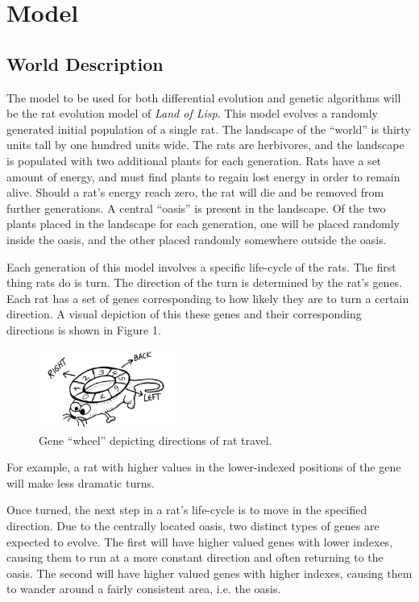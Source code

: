 \documentclass{sig-alternate}
\begin{document}
\section{Model}

\subsection{World Description}
The model to be used for both differential evolution and genetic algorithms will be the rat evolution model of \emph{Land of Lisp}.  This model evolves a randomly generated initial population of a single rat.  The landscape of the ``world'' is thirty units tall by one hundred units wide.  The rats are herbivores, and the landscape is populated with two additional plants for each generation.  Rats have a set amount of energy, and must find plants to regain lost energy in order to remain alive.  Should a rat's energy reach zero, the rat will die and be removed from further generations.  A central ``oasis'' is present in the landscape.  Of the two plants placed in the landscape for each generation, one will be placed randomly inside the oasis, and the other placed randomly somewhere outside the oasis. 

Each generation of this model involves a specific life-cycle of the rats.  The first thing rats do is turn.  The direction of the turn is determined by the rat's genes.  Each rat has a set of genes corresponding to how likely they are to turn a certain direction.  A visual depiction of this these genes and their corresponding directions is shown in Figure 1.  \begin{figure}
\centering
\includegraphics[width=0.4\textwidth]{rat_wheel.PNG}
\caption{Gene ``wheel'' depicting directions of rat travel.}
\end{figure}
For example, a rat with higher values in the lower-indexed positions of the gene will make less dramatic turns.  

Once turned, the next step in a rat's life-cycle is to move in the specified direction.  Due to the centrally located oasis, two distinct types of genes are expected to evolve.  The first will have higher valued genes with lower indexes, causing them to run at a more constant direction and often returning to the oasis.  The second will have higher valued genes with higher indexes, causing them to wander around a fairly consistent area, i.e. the oasis.  
\end{document}
